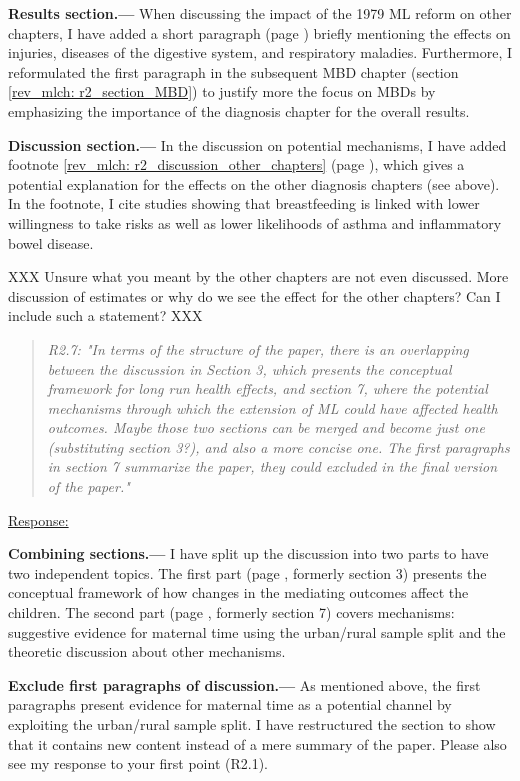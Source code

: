 \textbf{Results section.---} When discussing the impact of the 1979 ML reform on other chapters, I have added a short paragraph (page \pageref{rev_mlch: r2_results_other chapters}) briefly mentioning the effects on injuries, diseases of the digestive system, and respiratory maladies. Furthermore, I reformulated the first paragraph in the subsequent MBD chapter (section \ref{rev_mlch: r2_section_MBD}) to justify more the focus on MBDs by emphasizing the importance of the diagnosis chapter for the overall results.

\textbf{Discussion section.---} In the discussion on potential mechanisms, I have added footnote \ref{rev_mlch: r2_discussion_other_chapters} (page \pageref{rev_mlch: r2_discussion_other_chapters}), which gives a potential explanation for the effects on the other diagnosis chapters (see above). In the footnote, I cite studies showing that breastfeeding is linked with lower willingness to take risks as well as lower likelihoods of asthma and inflammatory bowel disease.


{\color{red} XXX Unsure what you meant by the other chapters are not even discussed. More discussion of estimates or why do we see the effect for the other chapters?
Can I include such a statement? XXX}

\bigskip
{}
\begin{quote}
	\textit{R2.7: "In terms of the structure of the paper, there is an overlapping between the discussion in Section 3, which presents the conceptual framework for long run health effects, and section 7, where the potential mechanisms through which the extension of ML could have affected health outcomes. Maybe those two sections can be merged and become just one (substituting section 3?), and also a more concise one. The first paragraphs in section 7 summarize the paper, they could excluded in the final version of the paper."}
\end{quote}
\underline{Response:} 

\textbf{Combining sections.---} I have split up the discussion into two parts to have two independent topics. The first part (page \pageref{rev_mlch: restructure_discussion_framework}, formerly section 3) presents the conceptual framework of how changes in the mediating outcomes affect the children. The second part (page \pageref{ref_mlch: discussion_mechanisms}, formerly section 7) covers mechanisms: suggestive evidence for maternal time using the urban/rural sample split and the theoretic discussion about other mechanisms.



\textbf{Exclude first paragraphs of discussion.---} As mentioned above, the first paragraphs present evidence for maternal time as a potential channel by exploiting the urban/rural sample split. I have restructured the section to show that it contains new content instead of a mere summary of the paper. Please also see my response to your first point (R2.1).

 


